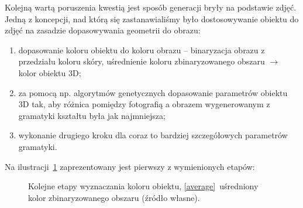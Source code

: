 Kolejną wartą poruszenia kwestią jest sposób generacji bryły na podstawie zdjęć.
Jedną z koncepcji, nad którą się zastanawialiśmy było dostosowywanie obiektu do
zdjęć na zasadzie dopasowywania geometrii do obrazu:
\begin{enumerate}
 \item dopasowanie koloru obiektu do koloru obrazu -- binaryzacja obrazu z
 przedziału koloru skóry, uśrednienie koloru zbinaryzowanego obszaru
 $\longrightarrow$ kolor obiektu 3D;
 \item za pomocą np. algorytmów genetycznych dopasowanie parametrów obiektu 3D
 tak, aby różnica pomiędzy fotografią a obrazem wygenerowanym z gramatyki
 kształtu była jak najmniejsza;
 \item wykonanie drugiego kroku dla coraz to bardziej szczegółowych parametrów
 gramatyki.
\end{enumerate}
Na ilustracji~\ref{klaudia01} zaprezentowany jest pierwszy z wymienionych
etapów:
\begin{figure}[h!]
  \centering
  \caption{Kolejne etapy wyznaczania koloru obiektu, \ref{average}~uśredniony
  kolor zbinaryzowanego obszaru (źródło własne).}
  \label{klaudia01}
\end{figure}
